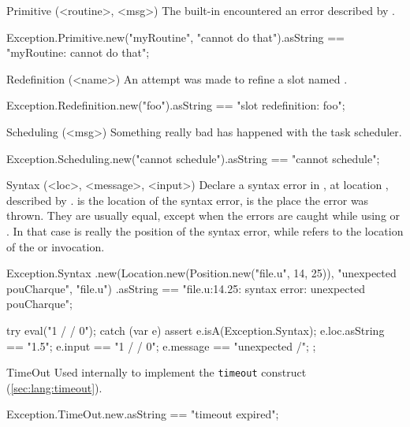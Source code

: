 \begin{urbiscriptapi}
\item[Primitive](<routine>, <msg>)
  The built-in  encountered an error described by
  .
\begin{urbiassert}
Exception.Primitive.new("myRoutine", "cannot do that").asString
  == "myRoutine: cannot do that";
\end{urbiassert}


\item[Redefinition](<name>)
  An attempt was made to refine a slot named .
\begin{urbiassert}
Exception.Redefinition.new("foo").asString
  == "slot redefinition: foo";
\end{urbiassert}


\item[Scheduling](<msg>)
  Something really bad has happened with the \urbi task scheduler.
\begin{urbiassert}
Exception.Scheduling.new("cannot schedule").asString
  == "cannot schedule";
\end{urbiassert}


\item[Syntax](<loc>, <message>, <input>)%
  Declare a syntax error in , at location , described by
  .   is the location of the syntax error,
   is the place the error was thrown.  They are usually equal,
  except when the errors are caught while using  or
  .  In that case  is really the position of
  the syntax error, while  refers to the location of the
   or  invocation.
\begin{urbiassert}
Exception.Syntax
  .new(Location.new(Position.new("file.u", 14, 25)),
       "unexpected pouCharque", "file.u")
  .asString
== "file.u:14.25: syntax error: unexpected pouCharque";
\end{urbiassert}

\begin{urbiscript}
try
{
  eval("1 / / 0");
}
catch (var e)
{
  assert
  {
    e.isA(Exception.Syntax);
    e.loc.asString == "1.5";
    e.input == "1 / / 0";
    e.message == "unexpected /";
  }
};
\end{urbiscript}


\item[TimeOut]%
  Used internally to implement the \lstinline|timeout| construct
  (\autoref{sec:lang:timeout}).
\begin{urbiassert}
Exception.TimeOut.new.asString
  == "timeout expired";
\end{urbiassert}



\end{urbiscriptapi}
